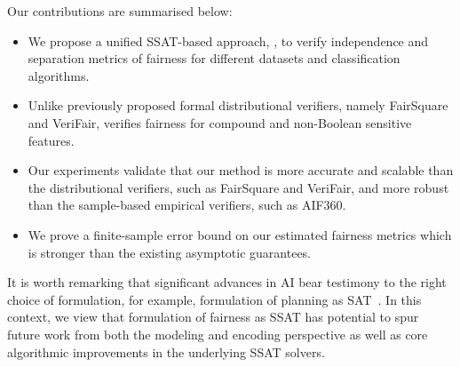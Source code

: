 Our contributions are summarised below:
\begin{itemize}
	\item We propose a unified SSAT-based approach, {\justicia}, to verify independence and separation metrics of fairness for different datasets and classification algorithms.
	\item Unlike previously proposed formal distributional verifiers, namely FairSquare and VeriFair, {\justicia} verifies fairness for compound and non-Boolean sensitive features.%
	\item Our experiments validate that our method is more accurate and scalable than the distributional verifiers, such as FairSquare and VeriFair, and more robust than the sample-based empirical verifiers, such as AIF360.
	\item We prove a finite-sample error bound on our estimated fairness metrics which is stronger than the existing asymptotic guarantees.
\end{itemize}

It is worth remarking that significant advances in AI bear testimony to the right choice of formulation, for example, formulation of planning as SAT~\cite{kautz1992planning}. In this context, we view that formulation of fairness as SSAT has potential to spur future work from both the modeling and encoding perspective as well as core algorithmic improvements in the underlying SSAT solvers.  

